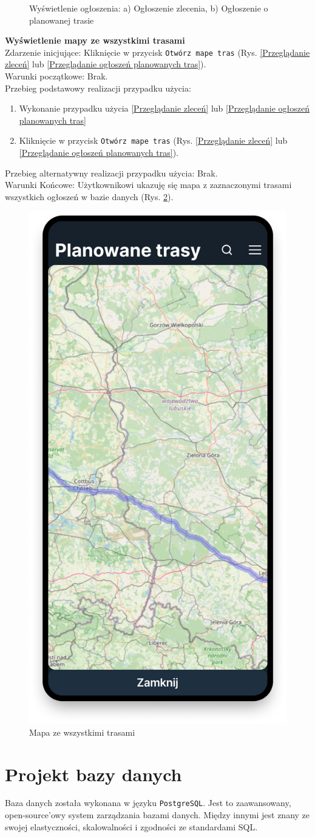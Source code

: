 \begin{figure}[H]
\begin{tabular}{@{}ccc@{}}
    \end{tabular}
    \caption{Wyświetlenie ogłoszenia: a) Ogłoszenie zlecenia, b) Ogłoszenie o planowanej trasie}
	\label{Rys. fig:Wyświetlenie ogłoszenia - ab}
\end{figure}

\textbf{Wyświetlenie mapy ze wszystkimi trasami} \\
Zdarzenie inicjujące: Kliknięcie w przycisk \texttt{Otwórz mape tras} (Rys. \ref{Przeglądanie zleceń} lub \ref{Przeglądanie ogłoszeń planowanych tras}). \\
Warunki początkowe: Brak. \\
Przebieg podstawowy realizacji przypadku użycia:
\begin{enumerate}
    \item Wykonanie przypadku użycia \ref{Przeglądanie zleceń} lub \ref{Przeglądanie ogłoszeń planowanych tras}
    \item Kliknięcie w przycisk \texttt{Otwórz mape tras} (Rys. \ref{Przeglądanie zleceń} lub \ref{Przeglądanie ogłoszeń planowanych tras}).
\end{enumerate}
Przebieg alternatywny realizacji przypadku użycia: Brak. \\
Warunki Końcowe: Użytkownikowi ukazuję się mapa z zaznaczonymi trasami wszystkich ogłoszeń w bazie danych (Rys. \ref{Rys. fig:Mapa ze wszystkimi trasami}).\\
\begin{figure}[H]
	\centering
		\includegraphics[width=0.3\linewidth]{rozdzial1/mapa.png}
	\caption{Mapa ze wszystkimi trasami}
	\label{Rys. fig:Mapa ze wszystkimi trasami}
\end{figure}

\section{Projekt bazy danych}
Baza danych została wykonana w języku \texttt{PostgreSQL}. Jest to zaawansowany, open-source'owy system zarządzania bazami danych. Między innymi jest znany ze swojej elastyczności, skalowalności i zgodności ze standardami SQL.

